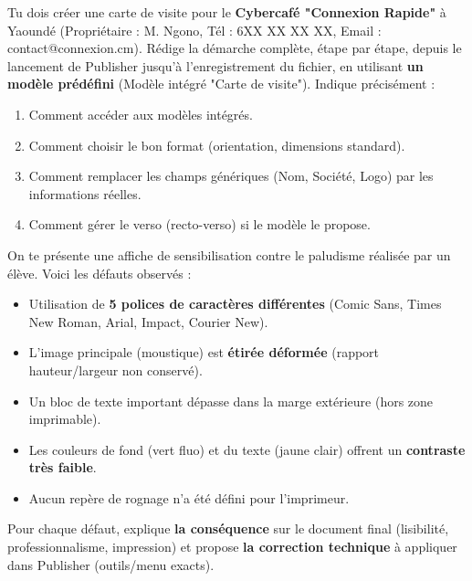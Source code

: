 \documentclass[11pt]{article}
\begin{document}
\begin{exercice}
Tu dois créer une carte de visite pour le \textbf{Cybercafé "Connexion Rapide"} à Yaoundé (Propriétaire : M. Ngono, Tél : 6XX XX XX XX, Email : contact@connexion.cm).
Rédige la démarche complète, étape par étape, depuis le lancement de Publisher jusqu'à l'enregistrement du fichier, en utilisant \textbf{un modèle prédéfini} (Modèle intégré "Carte de visite").
Indique précisément :
\begin{enumerate}
    \item Comment accéder aux modèles intégrés.
    \item Comment choisir le bon format (orientation, dimensions standard).
    \item Comment remplacer les champs génériques (Nom, Société, Logo) par les informations réelles.
    \item Comment gérer le verso (recto-verso) si le modèle le propose.
\end{enumerate}
\end{exercice}

\begin{exercice}
On te présente une affiche de sensibilisation contre le paludisme réalisée par un élève. Voici les défauts observés :
\begin{itemize}
    \item Utilisation de \textbf{5 polices de caractères différentes} (Comic Sans, Times New Roman, Arial, Impact, Courier New).
    \item L'image principale (moustique) est \textbf{étirée déformée} (rapport hauteur/largeur non conservé).
    \item Un bloc de texte important dépasse dans la marge extérieure (hors zone imprimable).
    \item Les couleurs de fond (vert fluo) et du texte (jaune clair) offrent un \textbf{contraste très faible}.
    \item Aucun repère de rognage n'a été défini pour l'imprimeur.
\end{itemize}
Pour chaque défaut, explique \textbf{la conséquence} sur le document final (lisibilité, professionnalisme, impression) et propose \textbf{la correction technique} à appliquer dans Publisher (outils/menu exacts).
\end{exercice}
\end{document}
